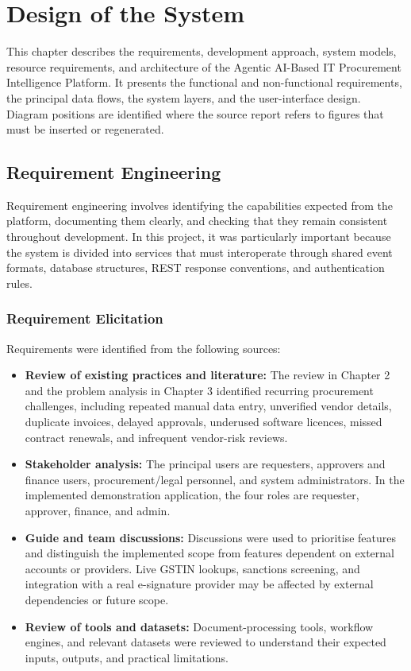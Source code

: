 \documentclass[12pt,a4paper]{report}
\begin{document}
\chapter{Design of the System}

This chapter describes the requirements, development approach, system
models, resource requirements, and architecture of the Agentic AI-Based
IT Procurement Intelligence Platform. It presents the functional and
non-functional requirements, the principal data flows, the system
layers, and the user-interface design. Diagram positions are identified
where the source report refers to figures that must be inserted or
regenerated.

\section{Requirement Engineering}

Requirement engineering involves identifying the capabilities expected
from the platform, documenting them clearly, and checking that they
remain consistent throughout development. In this project, it was
particularly important because the system is divided into services that
must interoperate through shared event formats, database structures,
REST response conventions, and authentication rules.

\subsection{Requirement Elicitation}

Requirements were identified from the following sources:

\begin{itemize}
    \item \textbf{Review of existing practices and literature:}
    The review in Chapter 2 and the problem analysis in Chapter 3
    identified recurring procurement challenges, including repeated
    manual data entry, unverified vendor details, duplicate invoices,
    delayed approvals, underused software licences, missed contract
    renewals, and infrequent vendor-risk reviews.

    \item \textbf{Stakeholder analysis:}
    The principal users are requesters, approvers and finance users,
    procurement/legal personnel, and system administrators. In the
    implemented demonstration application, the four roles are
    requester, approver, finance, and admin.

    \item \textbf{Guide and team discussions:}
    Discussions were used to prioritise features and distinguish the
    implemented scope from features dependent on external accounts or
    providers. Live GSTIN lookups, sanctions screening, and integration
    with a real e-signature provider may be affected by external
    dependencies or future scope.

    \item \textbf{Review of tools and datasets:}
    Document-processing tools, workflow engines, and relevant datasets
    were reviewed to understand their expected inputs, outputs, and
    practical limitations.
\end{itemize}
\end{document}
